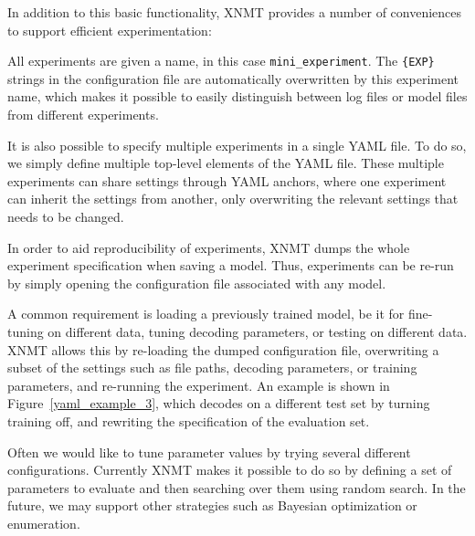 \documentclass[]{article}
\begin{document}
In addition to this basic functionality, XNMT provides a number of conveniences to support efficient experimentation:
\begin{description}
\setlength{\itemsep}{0.5pt}
\item[Named experiments and overwriting:] All experiments are given a name, in this case \texttt{mini\_experiment}. The \texttt{\{EXP\}} strings in the configuration file are automatically overwritten by this experiment name, which makes it possible to easily distinguish between log files or model files from different experiments.
\item[Multiple experiments and sharing of parameters:] It is also possible to specify multiple experiments in a single YAML file. To do so, we simply define multiple top-level elements of the YAML file. These multiple experiments can share settings through YAML anchors, where one experiment can inherit the settings from another, only overwriting the relevant settings that needs to be changed.

\item[Saving configurations:] In order to aid reproducibility of experiments, XNMT dumps the whole experiment specification when saving a model. Thus, experiments can be re-run by simply opening the configuration file associated with any model.
\item[Re-starting training:] A common requirement is loading a previously trained model, be it for fine-tuning on different data, tuning decoding parameters, or testing on different data. XNMT allows this by re-loading the dumped configuration file, overwriting a subset of the settings such as file paths, decoding parameters, or training parameters, and re-running the experiment. An example is shown in Figure~\ref{yaml_example_3}, which decodes on a different test set by turning training off, and rewriting the specification of the evaluation set.
\item[Random parameter search:] Often we would like to tune parameter values by trying several different configurations. Currently XNMT makes it possible to do so by defining a set of parameters to evaluate and then searching over them using random search. In the future, we may support other strategies such as Bayesian optimization or enumeration.
\end{description}
\end{document}
